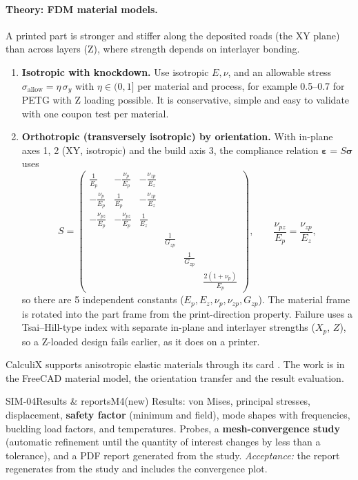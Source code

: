 \paragraph{Theory: FDM material models.} A printed part is stronger and stiffer along the deposited roads
(the XY plane) than across layers (Z), where strength depends on interlayer bonding.
\begin{enumerate}
  \item \textbf{Isotropic with knockdown.} Use isotropic $E,\nu$, and an allowable stress
        $\sigma_{\text{allow}}=\eta\,\sigma_y$ with $\eta\in(0,1]$ per material and process, for example
        0.5--0.7 for PETG with Z loading possible. It is conservative, simple and easy to validate with one
        coupon test per material.
  \item \textbf{Orthotropic (transversely isotropic) by orientation.} With in-plane axes 1, 2 (XY, isotropic)
        and the build axis 3, the compliance relation $\boldsymbol\varepsilon=S\boldsymbol\sigma$ uses
        \[
          S=\begin{pmatrix}
          \frac1{E_p}&-\frac{\nu_p}{E_p}&-\frac{\nu_{zp}}{E_z}&&&\\
          -\frac{\nu_p}{E_p}&\frac1{E_p}&-\frac{\nu_{zp}}{E_z}&&&\\
          -\frac{\nu_{pz}}{E_p}&-\frac{\nu_{pz}}{E_p}&\frac1{E_z}&&&\\
          &&&\frac1{G_{zp}}&&\\&&&&\frac1{G_{zp}}&\\&&&&&\frac{2(1+\nu_p)}{E_p}
          \end{pmatrix},
          \qquad \frac{\nu_{pz}}{E_p}=\frac{\nu_{zp}}{E_z},
        \]
        so there are 5 independent constants ($E_p,E_z,\nu_p,\nu_{zp},G_{zp}$). The material frame is rotated
        into the part frame from the print-direction property. Failure uses a Tsai--Hill-type index with
        separate in-plane and interlayer strengths ($X_p$, $Z$), so a Z-loaded design fails earlier, as it does
        on a printer.
\end{enumerate}
CalculiX supports anisotropic elastic materials through its  card
\verify. The work is in the FreeCAD material model, the orientation transfer and the result evaluation.

\begin{epic}{SIM-04}{Results \& reports}{M4}{\stTodo}{(new)}
Results: von Mises, principal stresses, displacement, \textbf{safety factor} (minimum and field), mode shapes
with frequencies, buckling load factors, and temperatures. Probes, a \textbf{mesh-convergence study}
(automatic refinement until the quantity of interest changes by less than a tolerance), and a PDF report
generated from the study.
\emph{Acceptance:} the report regenerates from the study and includes the convergence plot.
\end{epic}


